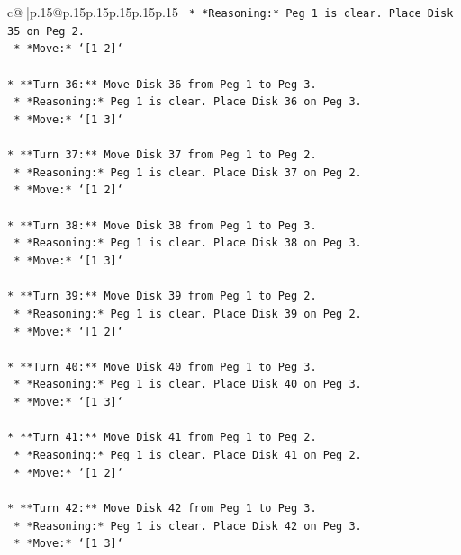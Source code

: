 \documentclass{article}
\begin{document}
{\begin{supertabular}{c@{$\;$}|p{.15\linewidth}@{}p{.15\linewidth}p{.15\linewidth}p{.15\linewidth}p{.15\linewidth}p{.15\linewidth}}
{{{\texttt{    *   *Reasoning:* Peg 1 is clear. Place Disk 35 on Peg 2.} \\
\texttt{    *   *Move:* `{[}1 2{]}`} \\
\\ 
\texttt{*   **Turn 36:** Move Disk 36 from Peg 1 to Peg 3.} \\
\texttt{    *   *Reasoning:* Peg 1 is clear. Place Disk 36 on Peg 3.} \\
\texttt{    *   *Move:* `{[}1 3{]}`} \\
\\ 
\texttt{*   **Turn 37:** Move Disk 37 from Peg 1 to Peg 2.} \\
\texttt{    *   *Reasoning:* Peg 1 is clear. Place Disk 37 on Peg 2.} \\
\texttt{    *   *Move:* `{[}1 2{]}`} \\
\\ 
\texttt{*   **Turn 38:** Move Disk 38 from Peg 1 to Peg 3.} \\
\texttt{    *   *Reasoning:* Peg 1 is clear. Place Disk 38 on Peg 3.} \\
\texttt{    *   *Move:* `{[}1 3{]}`} \\
\\ 
\texttt{*   **Turn 39:** Move Disk 39 from Peg 1 to Peg 2.} \\
\texttt{    *   *Reasoning:* Peg 1 is clear. Place Disk 39 on Peg 2.} \\
\texttt{    *   *Move:* `{[}1 2{]}`} \\
\\ 
\texttt{*   **Turn 40:** Move Disk 40 from Peg 1 to Peg 3.} \\
\texttt{    *   *Reasoning:* Peg 1 is clear. Place Disk 40 on Peg 3.} \\
\texttt{    *   *Move:* `{[}1 3{]}`} \\
\\ 
\texttt{*   **Turn 41:** Move Disk 41 from Peg 1 to Peg 2.} \\
\texttt{    *   *Reasoning:* Peg 1 is clear. Place Disk 41 on Peg 2.} \\
\texttt{    *   *Move:* `{[}1 2{]}`} \\
\\ 
\texttt{*   **Turn 42:** Move Disk 42 from Peg 1 to Peg 3.} \\
\texttt{    *   *Reasoning:* Peg 1 is clear. Place Disk 42 on Peg 3.} \\
\texttt{    *   *Move:* `{[}1 3{]}`} \\
\\ 
}}}
\end{supertabular}}
\end{document}
